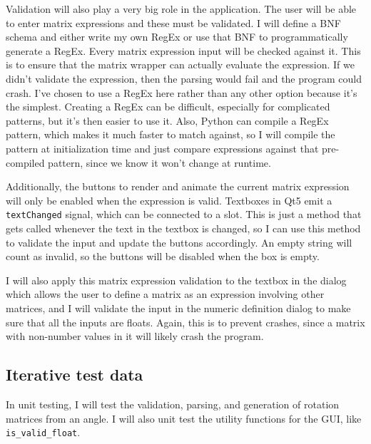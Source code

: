\documentclass[../main.tex]{subfiles}
\begin{document}
Validation will also play a very big role in the application. The user will be able to enter matrix expressions and these must be validated. I will define a BNF schema and either write my own RegEx or use that BNF to programmatically generate a RegEx. Every matrix expression input will be checked against it. This is to ensure that the matrix wrapper can actually evaluate the expression. If we didn't validate the expression, then the parsing would fail and the program could crash. I've chosen to use a RegEx here rather than any other option because it's the simplest. Creating a RegEx can be difficult, especially for complicated patterns, but it's then easier to use it. Also, Python can compile a RegEx pattern, which makes it much faster to match against, so I will compile the pattern at initialization time and just compare expressions against that pre-compiled pattern, since we know it won't change at runtime.

Additionally, the buttons to render and animate the current matrix expression will only be enabled when the expression is valid. Textboxes in Qt5 emit a \texttt{textChanged} signal, which can be connected to a slot. This is just a method that gets called whenever the text in the textbox is changed, so I can use this method to validate the input and update the buttons accordingly. An empty string will count as invalid, so the buttons will be disabled when the box is empty.

I will also apply this matrix expression validation to the textbox in the dialog which allows the user to define a matrix as an expression involving other matrices, and I will validate the input in the numeric definition dialog to make sure that all the inputs are floats. Again, this is to prevent crashes, since a matrix with non-number values in it will likely crash the program.

\subsection{Iterative test data\label{subsection:iterative-test-data}}


In unit testing, I will test the validation, parsing, and generation of rotation matrices from an angle. I will also unit test the utility functions for the GUI, like \texttt{is\_valid\_float}.
\end{document}
